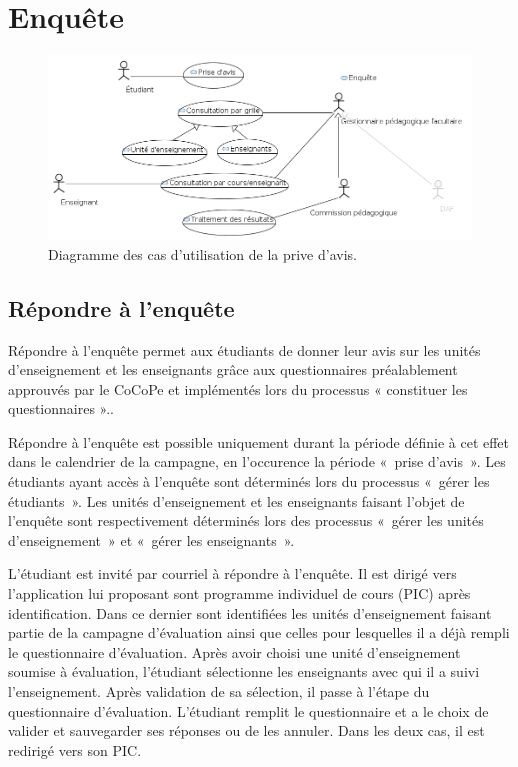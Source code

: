 \documentclass[a4paper,11pt]{report}
\begin{document}
\newpage
\section{Enquête}

\begin{figure}[ht]
\includegraphics[width=\linewidth]{workspace/evalens-usecases/prise_avis.png}
\caption{Diagramme des cas d'utilisation de la prive d'avis.}
\label{fig:usecase-avis}
\end{figure}

\subsection{Répondre à l'enquête}
Répondre à l'enquête permet aux étudiants de donner leur avis sur les unités d'enseignement et les enseignants grâce aux questionnaires préalablement approuvés par le CoCoPe et implémentés lors du processus « constituer les questionnaires »..

Répondre à l'enquête est possible uniquement durant la période définie à cet effet dans le calendrier de la campagne, en l'occurence la période «~prise d'avis~».
Les étudiants ayant accès à l'enquête sont déterminés lors du processus «~gérer les étudiants~».
Les unités d'enseignement et les enseignants faisant l'objet de l'enquête sont respectivement déterminés lors des processus «~gérer les unités d'enseignement~» et «~gérer les enseignants~».

L'étudiant est invité par courriel à répondre à l'enquête.
Il est dirigé vers l'application lui proposant sont programme individuel de cours (PIC) après identification.
Dans ce dernier sont identifiées les unités d'enseignement faisant partie de la campagne d'évaluation ainsi que celles pour lesquelles il a déjà rempli le questionnaire d'évaluation.
Après avoir choisi une unité d'enseignement soumise à évaluation, l'étudiant sélectionne les enseignants avec qui il a suivi l'enseignement.
Après validation de sa sélection, il passe à l'étape du questionnaire d'évaluation.
L'étudiant remplit le questionnaire et a le choix de valider et sauvegarder ses réponses ou de les annuler.
Dans les deux cas, il est redirigé vers son PIC.
\end{document}
